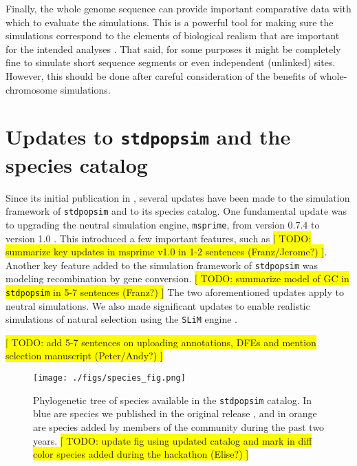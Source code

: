 \documentclass[hidelinks]{article}
\newcommand{\stdpopsim}{\texttt{stdpopsim}\xspace}
\begin{document}
Finally, the whole genome sequence can provide important comparative
data with which to evaluate the simulations. This is a powerful tool for
making sure the simulations correspond to the elements of biological
realism that are important for the intended analyses \citep{Hsieh2016a}. 
%
That said, for some purposes it might be completely fine to simulate short sequence
segments or even independent (unlinked) sites. However, this should be done after
careful consideration  of the benefits of whole-chromosome simulations.


\hypertarget{sec3}{%
	\section*{Updates to \texttt{\stdpopsim} and the species catalog}\label{sec:expanded-catalog}}

Since its initial publication in \cite{Adrion2020}, several updates have been made to  the simulation framework of \texttt{\stdpopsim} and to its species catalog. One fundamental update was to upgrading the neutral simulation engine, \texttt{msprime}, from version 0.7.4 to version 1.0 \citep{Baumdicker2022}. This introduced a few important features, such as %
\colorbox{yellow}{[ TODO: summarize key updates in msprime v1.0 in 1-2 sentences (Franz/Jerome?) ]}.
%
Another key feature added to the simulation framework of \texttt{\stdpopsim} was modeling recombination by gene conversion. %
\colorbox{yellow}{[ TODO: summarize model of GC in \stdpopsim in 5-7 sentences (Franz?) ]}
%
The two aforementioned updates apply to neutral simulations. We also made significant updates to enable realistic simulations of natural selection using the \texttt{SLiM} engine \citep{Haller2019}. %

\colorbox{yellow}{[ TODO: add 5-7 sentences on uploading annotations, DFEs and mention selection manuscript (Peter/Andy?) ]}
%



\begin{figure}
	\texttt{[image: ./figs/species\_fig.png]}
	\caption{Phylogenetic tree of species available in the \texttt{\stdpopsim} catalog. 
		In blue are species we published in the original release \citep{Adrion2020}, and in orange are species added by members of the community during the past two years. 
		\colorbox{yellow}{[ TODO: update fig using updated catalog and mark in diff color species added during the hackathon (Elise?) ]}}
	\label{fig:tree}
\end{figure}
\end{document}
